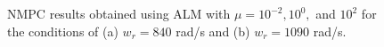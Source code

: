 \documentclass[journal]{IEEEtranTIE}
\begin{document}
\begin{figure}%
\centering
{}
\vfill
{}
\caption{NMPC results obtained using ALM with $\mu = 10^{-2}, 10^{0},$ and $10^{2}$ for the conditions of (a) $w_r = 840$ rad/s  and (b) $w_r = 1090$ rad/s.
}\label{Fig_ALM}
\end{figure}
\end{document}
